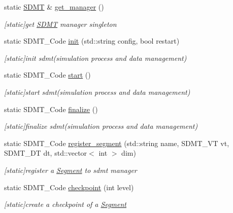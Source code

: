 \begin{DoxyCompactItemize}
\item 
static \hyperlink{class_s_d_m_t}{S\+D\+MT} \& \hyperlink{class_s_d_m_t_a58f43a16728b4d990ca10c1efe70740f}{get\+\_\+manager} ()
\begin{DoxyCompactList}\small\item\em \mbox{[}static\mbox{]}get \hyperlink{class_s_d_m_t}{S\+D\+MT} manager singleton \end{DoxyCompactList}\item 
static S\+D\+M\+T\+\_\+\+Code \hyperlink{class_s_d_m_t_a234a8848281f756b8a76dcf2b69fb343}{init} (std\+::string config, bool restart)
\begin{DoxyCompactList}\small\item\em \mbox{[}static\mbox{]}init sdmt(simulation process and data management) \end{DoxyCompactList}\item 
static S\+D\+M\+T\+\_\+\+Code \hyperlink{class_s_d_m_t_a0ee438570acc7a74676693b86fdc94a9}{start} ()
\begin{DoxyCompactList}\small\item\em \mbox{[}static\mbox{]}start sdmt(simulation process and data management) \end{DoxyCompactList}\item 
static S\+D\+M\+T\+\_\+\+Code \hyperlink{class_s_d_m_t_af56c324524d2b8684f268b78d7e64534}{finalize} ()
\begin{DoxyCompactList}\small\item\em \mbox{[}static\mbox{]}finalize sdmt(simulation process and data management) \end{DoxyCompactList}\item 
static S\+D\+M\+T\+\_\+\+Code \hyperlink{class_s_d_m_t_a4da48bca02cad8bfe78a1bafec4a1b1f}{register\+\_\+segment} (std\+::string name, S\+D\+M\+T\+\_\+\+VT vt, S\+D\+M\+T\+\_\+\+DT dt, std\+::vector$<$ int $>$ dim)
\begin{DoxyCompactList}\small\item\em \mbox{[}static\mbox{]}register a \hyperlink{struct_s_d_m_t_1_1_segment}{Segment} to sdmt manager \end{DoxyCompactList}\item 
static S\+D\+M\+T\+\_\+\+Code \hyperlink{class_s_d_m_t_ae6218bd71d632ae413bec2d588547fc8}{checkpoint} (int level)
\begin{DoxyCompactList}\small\item\em \mbox{[}static\mbox{]}create a checkpoint of a \hyperlink{struct_s_d_m_t_1_1_segment}{Segment} \end{DoxyCompactList}\item 

\end{DoxyCompactItemize}
